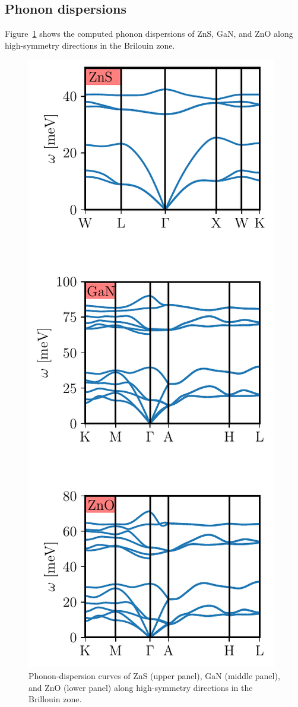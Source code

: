 \newpage
\subsection{Phonon dispersions}\label{app_phonon}

Figure~\ref{phonon_appendix} shows the computed phonon dispersions of ZnS, GaN, and ZnO along high-symmetry directions in the Brilouin zone.
\begin{figure}[H]
\centering
\includegraphics{work/plots/phonons/phonons_app.pdf}

\caption[ Phonon-dispersion curves of ZnS, GaN and ZnO.]{ Phonon-dispersion curves of ZnS (upper panel), GaN (middle panel), and ZnO (lower panel) along high-symmetry directions in the Brillouin zone. \label{phonon_appendix}}

\end{figure}

